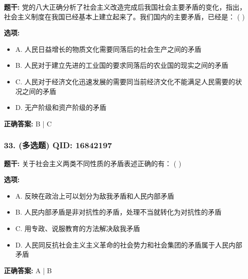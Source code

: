 \documentclass[12pt,UTF8]{ctexart}
\begin{document}
\textbf{题干:}
党的八大正确分析了社会主义改造完成后我国社会主要矛盾的变化，指出，社会主义制度在我国已经基本上建立起来了。我们国内的主要矛盾，已经是： ( )

\textbf{选项:}
\begin{itemize}[leftmargin=*]

  \item A. 人民日益增长的物质文化需要同落后的社会生产之间的矛盾

  \item B. 人民对于建立先进的工业国的要求同落后的农业国的现实之间的矛盾

  \item C. 人民对于经济文化迅速发展的需要同当前经济文化不能满足人民需要的状况之间的矛盾

  \item D. 无产阶级和资产阶级的矛盾

\end{itemize}

\textbf{正确答案:}
B | C

\vspace{0.3em}\hrulefill\vspace{0.7em}

\subsubsection*{33. (多选题) \small QID: 16842197}

\textbf{题干:}
关于社会主义两类不同性质的矛盾表述正确的有： ( )

\textbf{选项:}
\begin{itemize}[leftmargin=*]

  \item A. 反映在政治上可以划分为敌我矛盾和人民内部矛盾

  \item B. 人民内部矛盾是非对抗性的矛盾，处理不当就转化为对抗性的矛盾

  \item C. 用专政、说服教育的方法解决敌我矛盾

  \item D. 人民同反抗社会主义主义革命的社会势力和社会集团的矛盾属于人民内部矛盾

\end{itemize}

\textbf{正确答案:}
A | B

\vspace{0.3em}\hrulefill\vspace{0.7em}
\end{document}
